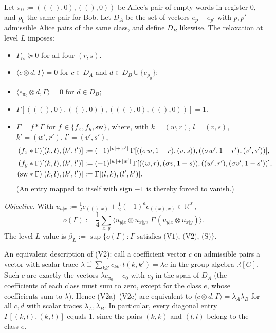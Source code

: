 \documentclass[aps,pra,onecolumn,notitlepage,superscriptaddress,longbibliography,nofootinbib,11pt]{revtex4-2}
\theoremstyle{remark}
\newcommand{\RR}{\mathbb{R}}
\newcommand{\cK}{\mathcal{K}}
\begin{document}
Let $\pi_0:=(((),0),((),0))$ be Alice's pair of empty words in register $0$, and $\rho_0$ the same pair for Bob. Let $D_A$ be the set of vectors $e_p-e_{p'}$ with $p,p'$ admissible Alice pairs of the same class, and define $D_B$ likewise. The relaxation at level $L$ imposes:
\begin{itemize}
\item[(V1)] $\Gamma_{rs}\succeq0$ for all four $(r,s)$.
\item[(V2a)] $\langle c\otimes d,\Gamma\rangle=0$ for $c\in D_A$ and $d\in D_B\cup\{e_{\rho_0}\}$;
\item[(V2b)] $\langle e_{\pi_0}\otimes d,\Gamma\rangle=0$ for $d\in D_B$;
\item[(V2c)] $\Gamma[(((),0),((),0)),(((),0),((),0))]=1$.
\item[(S)] $\Gamma=f*\Gamma$ for $f\in\{f_x,f_y,{\rm sw}\}$, where, with $k=(w,r)$, $l=(v,s)$, $k'=(w',r')$, $l'=(v',s')$,
\begin{align}
(f_x*\Gamma)[(k,l),(k',l')]&:=(-1)^{|v|+|v'|}\,\Gamma[((\sigma w,1-r),(v,s)),((\sigma w',1-r'),(v',s'))],\\
(f_y*\Gamma)[(k,l),(k',l')]&:=(-1)^{|w|+|w'|}\,\Gamma[((w,r),(\sigma v,1-s)),((w',r'),(\sigma v',1-s'))],\\
({\rm sw}*\Gamma)[(k,l),(k',l')]&:=\Gamma[(l,k),(l',k')].
\end{align}
(An entry mapped to itself with sign $-1$ is thereby forced to vanish.)
\end{itemize}
\emph{Objective.} With $u_{a|x}:=\frac12e_{((),x)}+\frac12(-1)^ae_{((x),x)}\in\RR^{\cK}$,
\begin{equation}
o(\Gamma):=\frac14\sum_{x,y}\big\langle u_{y|x}\otimes u_{x|y},\,\Gamma\,(u_{y|x}\otimes u_{x|y})\big\rangle .
\label{eq:S-objective}
\end{equation}
The level-$L$ value is $\beta_L:=\sup\{o(\Gamma):\Gamma\text{ satisfies (V1), (V2), (S)}\}$.

An equivalent description of (V2): call a coefficient vector $c$ on admissible pairs a vector with scalar trace $\lambda$ if $\sum_{kk'}c_{kk'}\,t(k,k')=\lambda e$ in the group algebra $\RR[G]$. Such $c$ are exactly the vectors $\lambda e_{\pi_0}+c_0$ with $c_0$ in the span of $D_A$ (the coefficients of each class must sum to zero, except for the class $e$, whose coefficients sum to $\lambda$). Hence (V2a)--(V2c) are equivalent to $\langle c\otimes d,\Gamma\rangle=\lambda_A\lambda_B$ for all $c,d$ with scalar traces $\lambda_A,\lambda_B$. In particular, every diagonal entry $\Gamma[(k,l),(k,l)]$ equals $1$, since the pairs $(k,k)$ and $(l,l)$ belong to the class $e$.
\end{document}
